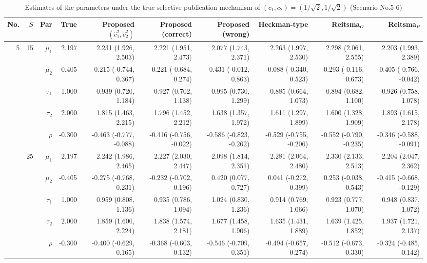 \documentclass[
]{article}
\begin{document}
\begin{table}

\caption{\label{tab:c11-par3}Estimates of the parameters under the true selective publication mechanism of $(c_1, c_2) = (1/\sqrt{2}, 1/\sqrt{2})$ (Scenario No.5-6)}
\centering
\begin{tabular}[t]{rrrrrrrrrr}
\toprule
No. & $S$ & Par & True & Proposed $(\hat{c}_1^2, \hat{c}_2^2)$ & Proposed (correct) & Proposed (wrong) & Heckman-type & Reitsma$_O$ & Reitsma$_P$\\
\midrule
5 & 15 & $\mu_1$ & 2.197 & 2.231 (1.926, 2.503) & 2.221 (1.951, 2.473) & 2.077 (1.743, 2.371) & 2.263 (1.997, 2.530) & 2.298 (2.061, 2.555) & 2.203 (1.993, 2.389)\\
 &  & $\mu_2$ & -0.405 & -0.215 (-0.744, 0.367) & -0.221 (-0.684, 0.274) & 0.431 (-0.012, 0.863) & 0.088 (-0.340, 0.523) & 0.293 (-0.116, 0.673) & -0.405 (-0.766, -0.042)\\
 &  & $\tau_1$ & 1.000 & 0.939 (0.720, 1.184) & 0.927 (0.702, 1.138) & 0.995 (0.730, 1.299) & 0.885 (0.664, 1.073) & 0.894 (0.682, 1.100) & 0.926 (0.758, 1.078)\\
 &  & $\tau_2$ & 2.000 & 1.815 (1.463, 2.215) & 1.796 (1.452, 2.212) & 1.638 (1.357, 1.972) & 1.611 (1.297, 1.899) & 1.600 (1.328, 1.909) & 1.893 (1.615, 2.178)\\
 &  & $\rho$ & -0.300 & -0.463 (-0.777, -0.088) & -0.416 (-0.756, -0.022) & -0.586 (-0.823, -0.262) & -0.529 (-0.755, -0.206) & -0.552 (-0.790, -0.235) & -0.346 (-0.588, -0.091)\\
\addlinespace
 & 25 & $\mu_1$ & 2.197 & 2.242 (1.986, 2.465) & 2.227 (2.030, 2.447) & 2.098 (1.814, 2.351) & 2.281 (2.064, 2.480) & 2.330 (2.133, 2.513) & 2.204 (2.047, 2.362)\\
 &  & $\mu_2$ & -0.405 & -0.275 (-0.768, 0.231) & -0.232 (-0.702, 0.196) & 0.420 (0.077, 0.727) & 0.041 (-0.272, 0.399) & 0.253 (-0.038, 0.543) & -0.415 (-0.668, -0.129)\\
 &  & $\tau_1$ & 1.000 & 0.959 (0.808, 1.136) & 0.935 (0.786, 1.094) & 1.024 (0.830, 1.236) & 0.914 (0.769, 1.066) & 0.923 (0.777, 1.070) & 0.948 (0.837, 1.072)\\
 &  & $\tau_2$ & 2.000 & 1.859 (1.600, 2.224) & 1.838 (1.574, 2.181) & 1.677 (1.458, 1.906) & 1.635 (1.431, 1.889) & 1.639 (1.425, 1.852) & 1.937 (1.721, 2.137)\\
 &  & $\rho$ & -0.300 & -0.400 (-0.629, -0.165) & -0.368 (-0.603, -0.132) & -0.546 (-0.709, -0.351) & -0.494 (-0.657, -0.274) & -0.512 (-0.673, -0.330) & -0.324 (-0.485, -0.142)\\

\end{tabular}
\end{table}
\end{document}
